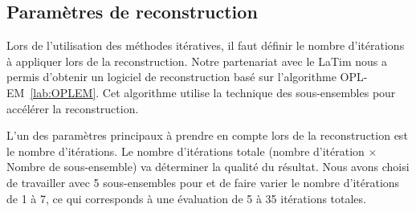 \subsection{Paramètres de reconstruction}
\label{lab:paramRecon}

Lors de l'utilisation des méthodes itératives, il faut définir le nombre d'itérations à appliquer lors de la reconstruction. Notre partenariat avec le LaTim nous a permis d'obtenir un logiciel de reconstruction basé sur l'algorithme OPL-EM~\ref{lab:OPLEM}. Cet algorithme utilise la technique des sous-ensembles pour accélérer la reconstruction.

L'un des paramètres principaux à prendre en compte lors de la reconstruction est le nombre d'itérations. Le nombre d'itérations totale (nombre d'itération $\times$ Nombre de sous-ensemble) va déterminer la qualité du résultat. Nous avons choisi de travailler avec 5 sous-ensembles pour et de faire varier le nombre d'itérations de 1 à 7, ce qui corresponds à une évaluation de 5 à 35 itérations totales.

